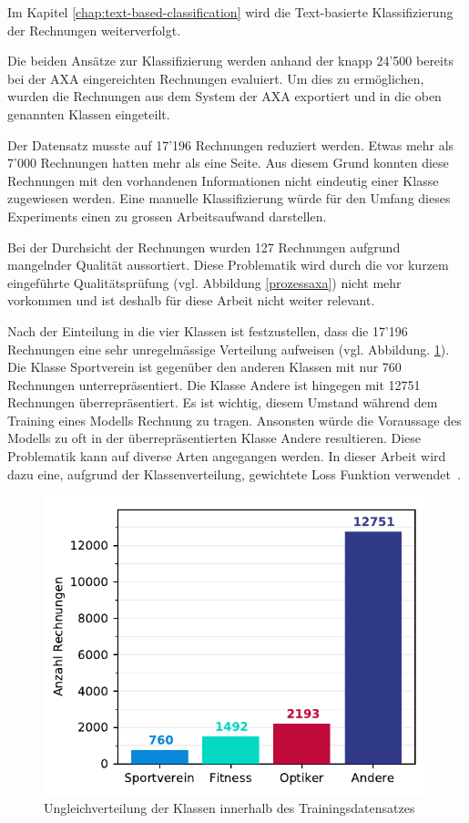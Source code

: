Im Kapitel \ref{chap:text-based-classification} wird die Text-basierte Klassifizierung der Rechnungen weiterverfolgt.

Die beiden Ansätze zur Klassifizierung werden anhand der knapp 24'500 bereits bei der AXA eingereichten Rechnungen evaluiert. Um dies zu ermöglichen, wurden die Rechnungen aus dem System der AXA exportiert und in die oben genannten Klassen eingeteilt. 

Der Datensatz musste auf 17'196 Rechnungen reduziert werden. Etwas mehr als 7'000 Rechnungen hatten mehr als eine Seite. Aus diesem Grund konnten diese Rechnungen mit den vorhandenen Informationen nicht eindeutig einer Klasse zugewiesen werden. Eine manuelle Klassifizierung würde für den Umfang dieses Experiments einen zu grossen Arbeitsaufwand darstellen.

Bei der Durchsicht der Rechnungen wurden 127 Rechnungen aufgrund mangelnder Qualität aussortiert. Diese Problematik wird durch die vor kurzem eingeführte Qualitätsprüfung (vgl. Abbildung \ref{prozessaxa}) nicht mehr vorkommen und ist deshalb für diese Arbeit nicht weiter relevant.

Nach der Einteilung in die vier Klassen ist festzustellen, dass die 17'196 Rechnungen eine sehr unregelmässige Verteilung aufweisen (vgl. Abbildung. \ref{class-distribution}). Die Klasse Sportverein ist gegenüber den anderen Klassen mit nur 760 Rechnungen unterrepräsentiert. Die Klasse Andere ist hingegen mit 12751 Rechnungen überrepräsentiert. Es ist wichtig, diesem Umstand während dem Training eines Modells Rechnung zu tragen. Ansonsten würde die Voraussage des Modells zu oft in der überrepräsentierten Klasse Andere resultieren. Diese Problematik kann auf diverse Arten angegangen werden. In dieser Arbeit wird dazu eine, aufgrund der Klassenverteilung, gewichtete Loss Funktion verwendet~\autocite{Buda2018}.

\begin{figure}[h]
    \captionsetup{width=.9\linewidth}
    \caption{Ungleichverteilung der Klassen innerhalb des Trainingsdatensatzes}
    \label{class-distribution}
    \centering
    \includegraphics[scale=1]{graphics/matplot/class-weight.pdf}
\end{figure}
